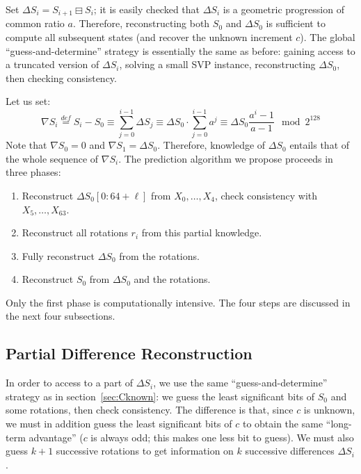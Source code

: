 \documentclass[submission,svgnames,journal=tosc]{iacrtrans}
\begin{document}
Set $\Delta S_i = S_{i+1} \boxminus S_i$; it is easily checked that $\Delta S_i$ is a
geometric progression of common ratio $a$. Therefore, reconstructing both $S_0$
and $\Delta S_0$ is sufficient to compute all subsequent states (and recover the
unknown increment $c$). The global ``guess-and-determine'' strategy is
essentially the same as before: gaining access to a truncated version of
$\Delta S_i$, solving a small SVP instance, reconstructing $\Delta S_0$, then
checking consistency.

Let us set:
\begin{equation}\label{eq:nabla}
  \nabla S_i \stackrel{def}{=} S_i - S_0 \equiv \sum_{j=0}^{i-1} \Delta S_j \equiv \Delta S_0 \cdot \sum_{j=0}^{i-1} a^j \equiv \Delta S_0 \frac{a^i-1}{a-1} \mod 2^{128}
\end{equation}
Note that $\nabla S_0 = 0$ and $\nabla S_1 = \Delta S_0$. Therefore, knowledge
of $\Delta S_0$ entails that of the whole sequence of $\nabla S_i$. The prediction
algorithm we propose proceeds in three phases:
\begin{enumerate}
\item Reconstruct $\Delta S_0[0:64+\ell]$ from $X_0, \dots, X_{4}$, check consistency with $X_5, \dots, X_{63}$.
\item Reconstruct all rotations $r_i$ from this partial knowledge.
\item Fully reconstruct $\Delta S_0$ from the rotations.
\item Reconstruct $S_0$ from $\Delta S_0$ and the rotations.
\end{enumerate}

\noindent Only the first phase is computationally intensive. The four steps are discussed in the next four subsections.

\subsection{Partial Difference Reconstruction}
\label{sec:cvp_small_2}

In order to access to a part of $\Delta S_i$, we use the same
``guess-and-determine'' strategy as in section~\ref{sec:Cknown}: we guess the
least significant bits of $S_0$ and some rotations, then check consistency. The
difference is that, since $c$ is unknown, we must in addition guess the least
significant bits of $c$ to obtain the same ``long-term advantage'' ($c$ is
always odd; this makes one less bit to guess). We must also guess $k+1$
successive rotations to get information on $k$ successive differences
$\Delta S_i$.
\end{document}
